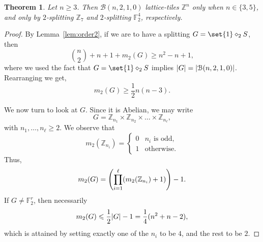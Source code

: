\documentclass[sort&compress]{elsarticle}
\DeclarePairedDelimiter\abs{\lvert}{\rvert}
\DeclarePairedDelimiter\parenv{\lparen}{\rparen}
\newcommand{\cB}{\mathcal{B}}
\renewcommand{\leq}{\leqslant}
\renewcommand{\geq}{\geqslant}
\newtheorem{theorem}{Theorem}
\newcommand{\F}{\mathbb{F}}
\newcommand{\Z}{\mathbb{Z}}
\newcommand{\splt}{\diamond}
\begin{document}
\begin{theorem}
  \label{th:no210} Let $n \geq 3$. Then 
  $\cB(n,2,1,0)$ lattice-tiles $\Z^n$ only when $n\in\{3, 5\}$, and
  only by $2$-splitting $\Z_7$ and $2$-splitting  $\F_2^4$,
  respectively.
\end{theorem}
\begin{proof}
  By Lemma~\ref{lem:order2}, if we are to have a splitting
  $G=\set{1}\splt_2 S$, then
  \[ \binom{n}{2}+n+1+{m_2(G)}\geq n^2-n+1,\]
  where we used the fact that $G=\set{1}\splt_2 S$ implies
  $\abs{G}=\abs{\cB(n,2,1,0)}$. Rearranging we get,
  \begin{equation}
    \label{eq:mgeq}
    m_2(G)\geq \frac{1}{2}n(n-3).
  \end{equation}

  We now turn to look at $G$. Since it is Abelian, we may write
  \[ G = \Z_{n_1}\times \Z_{n_2} \times \dots \times \Z_{n_\ell},\]
  with $n_1,\dots,n_\ell\geq 2$. We observe that
  \[ m_2(\Z_{n_i})=\begin{cases}
  0 & \text{$n_i$ is odd,} \\
  1 & \text{otherwise.}
  \end{cases}\]
  Thus,
  \[ m_2(G) = \parenv*{\prod_{i=1}^{\ell} (m_2(\Z_{n_i})+1)}-1.\]
  If $G\neq \F_2^r$, then necessarily
  \begin{equation}
    \label{eq:mleq}
    m_2(G)\leq \frac{1}{2}\abs{G}-1= \frac{1}{4}(n^2+n-2),
  \end{equation}
  which is attained by setting exactly one of the $n_i$ to be $4$, and
  the rest to be $2$.
  

\end{proof}
\end{document}
